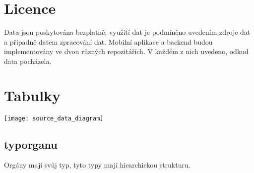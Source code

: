 \section{Licence}

Data jsou poskytována bezplatně, využití dat je podmíněno uvedením zdroje dat a případně datem zpracování dat. Mobilní aplikace a backend budou implementovány ve dvou různých repozitářích. V každém z nich uvedeno, odkud data pocházela.

\section{Tabulky}

\texttt{[image: source\_data\_diagram]}

\subsection{typ\textunderscore organu}

Orgány mají svůj typ, tyto typy mají hiearchickou strukturu.

